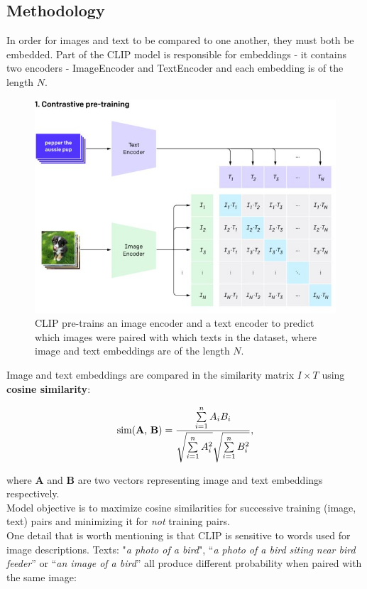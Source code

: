 \documentclass[11pt,a4paper,openany]{book}
\begin{document}
\subsection{Methodology}
\noindent In order for images and text to be compared to one another, they must both be embedded.  Part of the CLIP model is responsible for embeddings -  it contains two encoders - ImageEncoder and TextEncoder and each embedding is of the length $N$.
 \begin{figure}[ht!]
     \centering
     \includegraphics[scale=0.4]{figs/clip_model_1.jpeg}
     \caption{CLIP pre-trains an image encoder and a text encoder to predict which images were paired with which texts in the dataset, where image and text embeddings are of the length $N$. \cite{clip_blog}}
 \end{figure}
 \newline
\noindent Image and text embeddings are compared in the similarity matrix $I \times T$ using \textbf{cosine similarity}:

\begin{equation}
\text{sim(\textbf{A}, \textbf{B})} = \frac{ \sum\limits_{i=1}^{n}{A_i  B_i} }{ \sqrt{\sum\limits_{i=1}^{n}{A_i^2}}  \sqrt{\sum\limits_{i=1}^{n}{B_i^2}} },
\end{equation}

\noindent where \textbf{A} and \textbf{B} are two vectors representing image and text embeddings respectively. \\
\noindent Model objective is to maximize cosine similarities for successive training (image, text) pairs and minimizing it for \textit{not} training pairs. \\
One detail that is worth mentioning is that CLIP is sensitive to words used for image descriptions. Texts: "\textit{a photo of a bird}", “\textit{a photo of a bird siting near bird feeder}” or “\textit{an image of a bird}” all produce different probability when paired with the same image:
\end{document}
